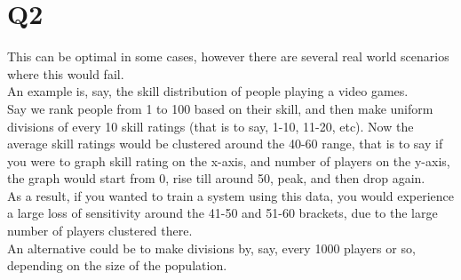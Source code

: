 \documentclass{article}
\begin{document}
	\section{Q2}
	This can be optimal in some cases, however there are several real world scenarios where this would fail.\\
An example is, say, the skill distribution of people playing a video games.\\
Say we rank people from 1 to 100 based on their skill, and then make uniform divisions of every 10 skill ratings (that is to say, 1-10, 11-20, etc). Now the average skill ratings would be clustered around the 40-60 range, that is to say if you were to graph skill rating on the x-axis, and number of players on the y-axis, the graph would start from 0, rise till around 50, peak, and then drop again.\\
As a result, if you wanted to train a system using this data, you would experience a large loss of sensitivity around the 41-50 and 51-60 brackets, due to the large number of players clustered there.\\
An alternative could be to make divisions by, say, every 1000 players or so, depending on the size of the population.

	
\end{document}
